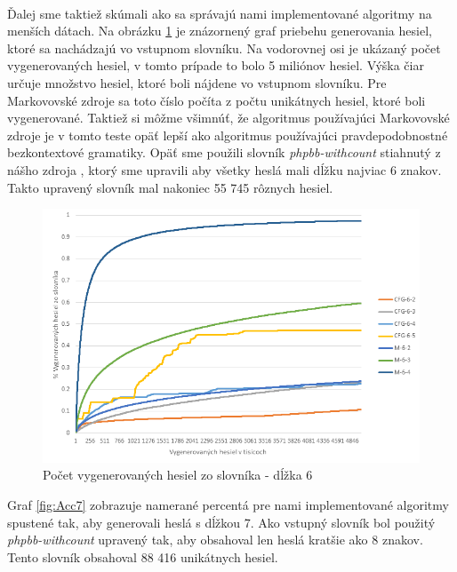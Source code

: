 \paragraph{}
Ďalej sme taktiež skúmali ako sa správajú nami implementované algoritmy na menších dátach. Na obrázku \ref{fig:Acc6} je znázornený graf priebehu generovania hesiel, ktoré sa nachádzajú vo vstupnom slovníku. Na vodorovnej osi je ukázaný počet vygenerovaných hesiel, v tomto prípade to bolo 5 miliónov hesiel. Výška čiar určuje množstvo hesiel, ktoré boli nájdene vo vstupnom slovníku. Pre Markovovské zdroje sa toto číslo počíta z počtu unikátnych hesiel, ktoré boli vygenerované. Taktiež si môžme všimnúť, že algoritmus používajúci Markovovské zdroje je v tomto teste opäť lepší ako algoritmus používajúci pravdepodobnostné bezkontextové gramatiky. Opäť sme použili slovník \emph{phpbb-withcount} stiahnutý z nášho zdroja \cite{dictionaries}, ktorý sme upravili aby všetky heslá mali dĺžku najviac 6 znakov. Takto upravený slovník mal nakoniec 55 745 rôznych hesiel.

\begin{figure}[ht]
    \centering
    \includegraphics[width=1\textwidth]{sameDictAcc6}
    \caption{Počet vygenerovaných hesiel zo slovníka - dĺžka 6}
    \label{fig:Acc6}
\end{figure}

\pargraph{}
Graf \ref{fig:Acc7} zobrazuje namerané percentá pre nami implementované algoritmy spustené tak, aby generovali heslá s dĺžkou 7. Ako vstupný slovník bol použitý \emph{phpbb-withcount} upravený tak, aby obsahoval len heslá kratšie ako 8 znakov. Tento slovník obsahoval 88 416 unikátnych hesiel.

